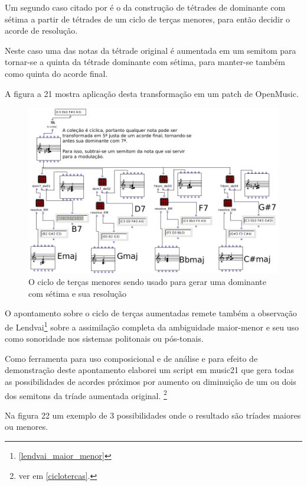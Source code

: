 \documentclass[
	12pt,				%
	openright,			%
	twoside,			%
	a4paper,			%
	english,			%
	french,				%
	spanish,			%
	brazil				%
	]{abntex2}
\begin{document}
Um segundo caso citado por  é o da construção de tétrades de dominante com sétima a partir de tétrades de um ciclo de terças menores, para então decidir o acorde de resolução. 

Neste caso uma das notas da tétrade original é aumentada em um semitom para tornar-se a quinta da tétrade dominante com sétima, para manter-se também como quinta do acorde final.


A figura a 21 mostra aplicação desta transformação em um patch de OpenMusic.


\begin{figure}[!h]
	\caption{\label{fig_grafico}O ciclo de terças menores sendo usado para gerar uma dominante com sétima e sua resolução   }
	\begin{center}
	    \includegraphics[scale=0.5]{ciclos/setimadominante.png}
	\end{center}
\end{figure}

O apontamento sobre o ciclo de terças aumentadas remete também a observação de Lendvai\footnote{ \autoref{lendvai_maior_menor} } sobre a assimilação completa da ambiguidade maior-menor e seu uso como sonoridade nos sistemas politonais ou pós-tonais. 

Como ferramenta para uso composicional e de análise e para efeito de demonstração deste apontamento elaborei um script em music21 que gera todas as possibilidades de acordes próximos por aumento ou diminuição de um ou dois dos semitons da tríade aumentada original. \footnote{ver em \autoref{ciclotercas}.}

Na figura 22 um exemplo de 3 possibilidades onde o resultado são tríades maiores ou menores.
\end{document}
